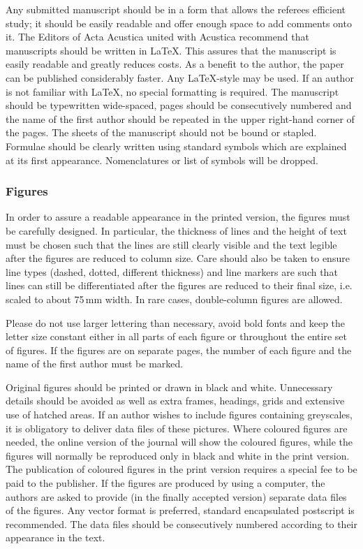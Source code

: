 \documentclass[twoside,twocolumn]{article}
\begin{document}
Any submitted manuscript should be in a form that allows the referees
efficient study; it should be easily readable and offer enough space to
add comments onto it. The Editors of Acta Acustica united with Acustica
recommend that manuscripts should be written in \LaTeX. This assures that
the manuscript is easily readable and greatly reduces costs. As a
benefit to the author, the paper can be published considerably faster.
Any \LaTeX-style may be used. If an author is not familiar with \LaTeX, no
special formatting is required. The manuscript should be typewritten
wide-spaced, pages should be consecutively numbered and the name of the
first author should be repeated in the upper right-hand corner of the
pages. The sheets of the manuscript should not be bound or stapled.
Formulae should be clearly written using standard symbols which are
explained at its first appearance. Nomenclatures or list of symbols will
be dropped.

\subsubsection{Figures}

In order to assure a readable appearance in the printed version, the
figures must be carefully designed. In particular, the thickness of
lines and the height of text must be chosen such that the lines are
still clearly visible and the text legible after the figures are reduced
to column size. Care should also be taken to ensure line types (dashed,
dotted, different thickness) and line markers are such that lines can
still be differentiated after the figures are reduced to their final
size, i.e. scaled to about 75\,mm width. In rare cases, double-column
figures are allowed.

Please do not use larger lettering than necessary, avoid bold fonts and
keep the letter size constant either in all parts of each figure or
throughout the entire set of figures. If the figures are on separate
pages, the number of each figure and the name of the first author must
be marked.

Original figures should be printed or drawn in black and white.
Unnecessary details should be avoided as well as extra frames, headings,
grids and extensive use of hatched areas. If an author wishes to include
figures containing greyscales, it is obligatory to deliver data files of
these pictures. Where coloured figures are needed, the online version of
the journal will show the coloured figures, while the figures will
normally be reproduced only in black and white in the print version. The
publication of coloured figures in the print version requires a special
fee to be paid to the publisher. If the figures are produced by using a
computer, the authors are asked to provide (in the finally accepted
version) separate data files of the figures. Any vector format is
preferred, standard encapsulated postscript is recommended. The data
files should be consecutively numbered according to their appearance in
the text.
\end{document}
